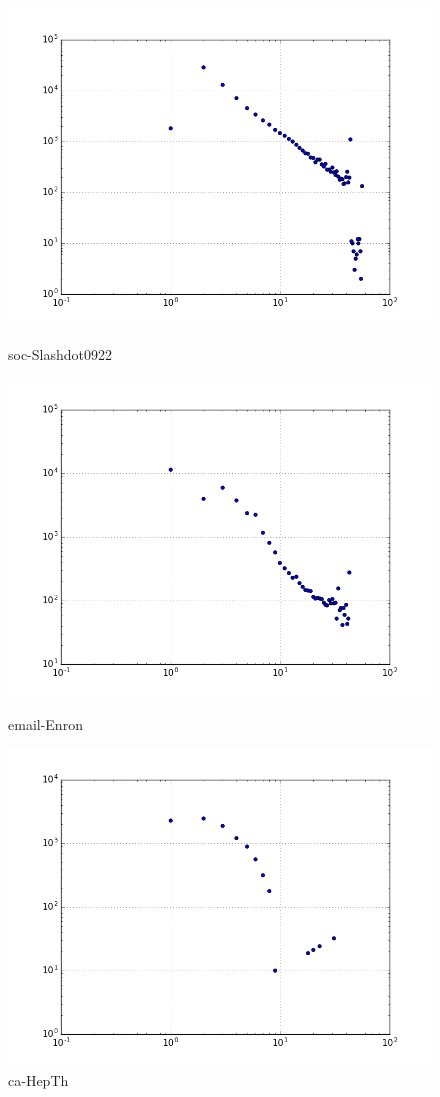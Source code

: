 \begin{figure}[H]
  \includegraphics[width=\linewidth]{img/slashDot09/kcore_dist.png}
  \caption*{soc-Slashdot0922}
\endminipage\hfill
{}
  \includegraphics[width=\linewidth]{img/email/kcore_dist.png}
  \caption*{email-Enron}
\endminipage\hfill
{}
  \includegraphics[width=\linewidth]{img/ca-HepTh/kcore_dist.png}
  \caption*{ca-HepTh}
\endminipage
\end{figure}

